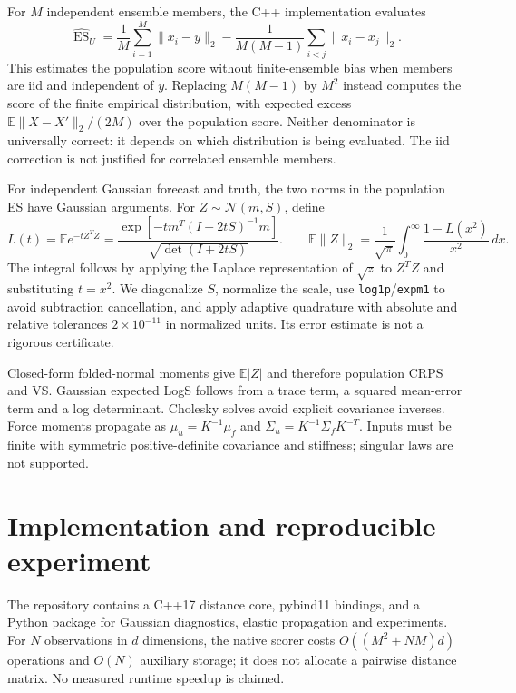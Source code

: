 \documentclass[10pt,a4paper]{article}
\newcommand{\E}{\mathbb E}
\begin{document}
For $M$ independent ensemble members, the C++ implementation evaluates
\begin{equation}
 \widehat{\operatorname{ES}}_U=
 \frac1M\sum_{i=1}^M\|x_i-y\|_2-
 \frac{1}{M(M-1)}\sum_{i<j}\|x_i-x_j\|_2. \label{eq:ensemble}
\end{equation}
This estimates the population score without finite-ensemble bias when members
are iid and independent of $y$. Replacing $M(M-1)$ by $M^2$ instead computes
the score of the finite empirical distribution, with expected excess
$\E\|X-X'\|_2/(2M)$ over the population score. Neither denominator is universally
correct: it depends on which distribution is being evaluated. The iid correction
is not justified for correlated ensemble members.

For independent Gaussian forecast and truth, the two norms in the population
ES have Gaussian arguments. For $Z\sim\mathcal N(m,S)$, define
\begin{equation}
 L(t)=\E e^{-tZ^TZ}=
 \frac{\exp[-t m^T(I+2tS)^{-1}m]}{\sqrt{\det(I+2tS)}}.
 \qquad
 \E\|Z\|_2=\frac1{\sqrt\pi}\int_0^\infty
             \frac{1-L(x^2)}{x^2}\,dx. \label{eq:quad}
\end{equation}
The integral follows by applying the Laplace representation of $\sqrt z$ to
$Z^TZ$ and substituting $t=x^2$. We diagonalize $S$, normalize the scale,
use \texttt{log1p}/\texttt{expm1} to avoid subtraction cancellation, and apply
adaptive quadrature with absolute and relative tolerances $2\times10^{-11}$
in normalized units. Its error estimate is not a rigorous certificate.

Closed-form folded-normal moments give $\E|Z|$ and therefore population CRPS
and VS. Gaussian expected LogS follows from a trace term, a squared mean-error
term and a log determinant. Cholesky solves avoid explicit covariance inverses.
Force moments propagate as $\mu_u=K^{-1}\mu_f$ and
$\Sigma_u=K^{-1}\Sigma_f K^{-T}$. Inputs must be finite with symmetric
positive-definite covariance and stiffness; singular laws are not supported.

\section{Implementation and reproducible experiment}
The repository contains a C++17 distance core, pybind11 bindings, and a Python
package for Gaussian diagnostics, elastic propagation and experiments.
For $N$ observations in $d$ dimensions, the native scorer costs
$O((M^2+NM)d)$ operations and $O(N)$ auxiliary storage; it does not allocate
a pairwise distance matrix. No measured runtime speedup is claimed.
\end{document}
